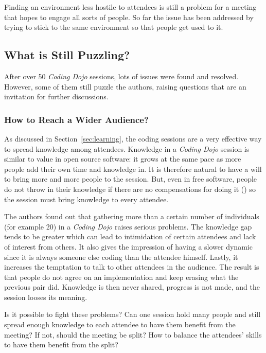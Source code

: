 Finding an environment less hostile to attendees is still a problem
for a meeting that hopes to engage all sorts of people. So far the
issue has been addressed by trying to stick to the same environment so
that people get used to it.

\subsection{What is Still Puzzling?}\label{ssub:puzzles}

After over 50 \emph{Coding Dojo} sessions, lots of issues were found
and resolved. However, some of them still puzzle the authors, raising
questions that are an invitation for further discussions.

\subsubsection{How to Reach a Wider Audience?}

As discussed in Section~\ref{sec:learning}, the coding sessions
are a very effective way to spread knowledge among attendees. Knowledge in a
\emph{Coding Dojo} session is similar to value in open source
software: it grows at the same pace as more people add their own time
and knowledge in. It is therefore natural to have a will to bring more
and more people to the session. But, even in free software, people do not
throw in their knowledge if there are no compensations for doing it
(\cite{RishabGhosh}) so the session must bring knowledge to every
attendee.

The authors found out that gathering more than a certain number of
individuals (for example 20) in a \emph{Coding Dojo} raises serious
problems. The knowledge gap tends to be greater which can lead to
intimidation of certain attendees and lack of interest from others. It
also gives the impression of having a slower dynamic since it is
always someone else coding than the attendee himself. Lastly, it
increases the temptation to talk to other attendees in the
audience. The result is that people do not agree on an implementation
and keep erasing what the previous pair did. Knowledge is then never
shared, progress is not made, and the session looses its meaning.

Is it possible to fight these problems? Can one session hold many
people and still spread enough knowledge to each attendee to have them
benefit from the meeting? If not, should the meeting be split? How
to balance the attendees' skills to have them benefit from the split?

